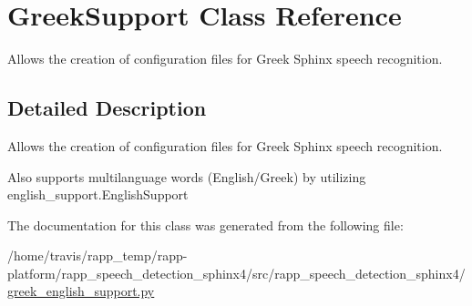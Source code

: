 \hypertarget{classGreekSupport}{\section{Greek\-Support Class Reference}
\label{classGreekSupport}
}


Allows the creation of configuration files for Greek Sphinx speech recognition.  




\subsection{Detailed Description}
Allows the creation of configuration files for Greek Sphinx speech recognition. 

Also supports multilanguage words (English/\-Greek) by utilizing english\-\_\-support.\-English\-Support 

The documentation for this class was generated from the following file\-:\begin{DoxyCompactItemize}
\item 
/home/travis/rapp\-\_\-temp/rapp-\/platform/rapp\-\_\-speech\-\_\-detection\-\_\-sphinx4/src/rapp\-\_\-speech\-\_\-detection\-\_\-sphinx4/\hyperlink{greek__english__support_8py}{greek\-\_\-english\-\_\-support.\-py}\end{DoxyCompactItemize}
